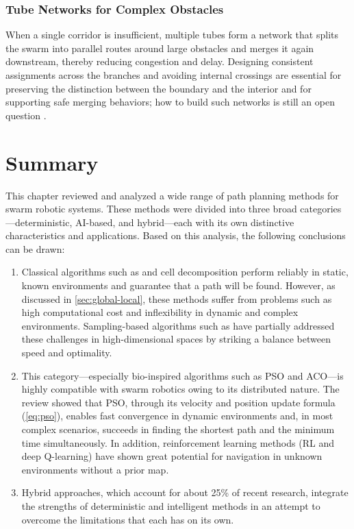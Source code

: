 \subsubsection{Tube Networks for Complex Obstacles}

When a single corridor is insufficient, multiple tubes form a network that splits
the swarm into parallel routes around large obstacles and merges it again
downstream, thereby reducing congestion and delay. Designing consistent
assignments across the branches and avoiding internal crossings are essential for
preserving the distinction between the boundary and the interior and for
supporting safe merging behaviors; how to build such networks is still an open
question \cite{mao2023optimal}.

\section{Summary}\label{sec:ch3-summary}

This chapter reviewed and analyzed a wide range of path planning methods for
swarm robotic systems. These methods were divided into three broad
categories---deterministic, AI-based, and hybrid---each with its own distinctive
characteristics and applications. Based on this analysis, the following
conclusions can be drawn:
\begin{enumerate}
  \item {} Classical algorithms such as \Astar{} and
        cell decomposition perform reliably in static, known environments and
        guarantee that a path will be found. However, as discussed in
        \cref{sec:global-local}, these methods suffer from problems such as high
        computational cost and inflexibility in dynamic and complex environments.
        Sampling-based algorithms such as \RRTstar{} have partially addressed
        these challenges in high-dimensional spaces by striking a balance between
        speed and optimality.
  \item {} This category---especially bio-inspired algorithms
        such as PSO and ACO---is highly compatible with swarm robotics owing to
        its distributed nature. The review showed that PSO, through its velocity
        and position update formula (\cref{eq:pso}), enables fast convergence in
        dynamic environments and, in most complex scenarios, succeeds in finding
        the shortest path and the minimum time simultaneously. In addition,
        reinforcement learning methods (RL and deep Q-learning) have shown great
        potential for navigation in unknown environments without a prior map.
  \item {} Hybrid approaches, which account for about 25\% of
        recent research, integrate the strengths of deterministic and intelligent
        methods in an attempt to overcome the limitations that each has on its
        own.
\end{enumerate}

